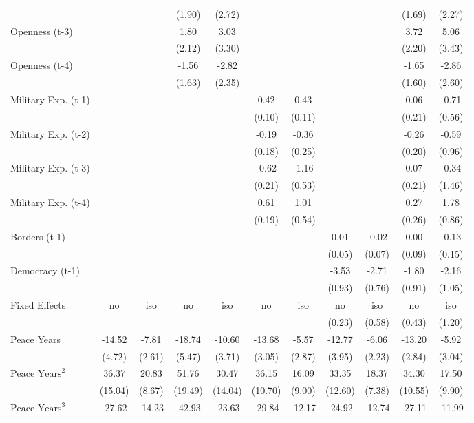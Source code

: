 \begin{tabular}{lcccccccccc}
&  &  & (1.90) & (2.72) &  &  &  &  & (1.69) & (2.27) \\
Openness (t-3) &  &  & 1.80 & 3.03 &  &  &  &  & 3.72 & 5.06 \\
&  &  & (2.12) & (3.30) &  &  &  &  & (2.20) & (3.43) \\
Openness (t-4) &  &  & -1.56 & -2.82 &  &  &  &  & -1.65 & -2.86 \\
&  &  & (1.63) & (2.35) &  &  &  &  & (1.60) & (2.60) \\
Military Exp. (t-1) &  &  &  &  & 0.42 & 0.43 &  &  & 0.06 & -0.71 \\
&  &  &  &  & (0.10) & (0.11) &  &  & (0.21) & (0.56) \\
Military Exp. (t-2) &  &  &  &  & -0.19 & -0.36 &  &  & -0.26 & -0.59 \\
&  &  &  &  & (0.18) & (0.25) &  &  & (0.20) & (0.96) \\
Military Exp. (t-3) &  &  &  &  & -0.62 & -1.16 &  &  & 0.07 & -0.34 \\
&  &  &  &  & (0.21) & (0.53) &  &  & (0.21) & (1.46) \\
Military Exp. (t-4) &  &  &  &  & 0.61 & 1.01 &  &  & 0.27 & 1.78 \\
&  &  &  &  & (0.19) & (0.54) &  &  & (0.26) & (0.86) \\
Borders (t-1) &  &  &  &  &  &  & 0.01 & -0.02 & 0.00 & -0.13 \\
&  &  &  &  &  &  & (0.05) & (0.07) & (0.09) & (0.15) \\
Democracy (t-1) &  &  &  &  &  &  & -3.53 & -2.71 & -1.80 & -2.16 \\
&  &  &  &  &  &  & (0.93) & (0.76) & (0.91) & (1.05) \\
\midrule
Fixed Effects & no & iso & no & iso & no & iso & no & iso & no & iso \\
&  &  &  &  &  &  & (0.23) & (0.58) & (0.43) & (1.20) \\
Peace Years & -14.52 & -7.81 & -18.74 & -10.60 & -13.68 & -5.57 & -12.77 & -6.06 & -13.20 & -5.92 \\
& (4.72) & (2.61) & (5.47) & (3.71) & (3.05) & (2.87) & (3.95) & (2.23) & (2.84) & (3.04) \\
$\text{Peace Years}^2$ & 36.37 & 20.83 & 51.76 & 30.47 & 36.15 & 16.09 & 33.35 & 18.37 & 34.30 & 17.50 \\
& (15.04) & (8.67) & (19.49) & (14.04) & (10.70) & (9.00) & (12.60) & (7.38) & (10.55) & (9.90) \\
$\text{Peace Years}^3$ & -27.62 & -14.23 & -42.93 & -23.63 & -29.84 & -12.17 & -24.92 & -12.74 & -27.11 & -11.99 \\

\end{tabular}
